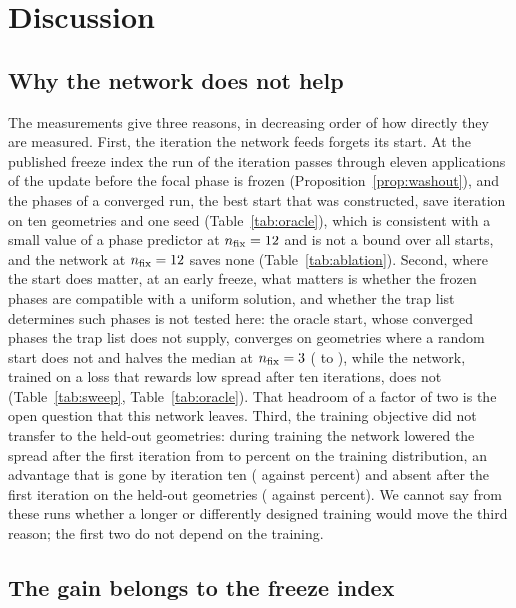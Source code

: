 \section{Discussion}\label{sec:discussion}

\subsection{Why the network does not help}\label{sec:why-not}

The measurements give three reasons, in decreasing order of how directly they are measured. First, the iteration the network feeds forgets its start. At the published freeze index the run of the iteration passes through eleven applications of the update before the focal phase is frozen (Proposition~\ref{prop:washout}), and the phases of a converged run, the best start that was constructed, save \OTwelveGain{} iteration on ten geometries and one seed (Table~\ref{tab:oracle}), which is consistent with a small value of a phase predictor at $n_{\mathrm{fix}}=12$ and is not a bound over all starts, and the network at $n_{\mathrm{fix}}=12$ saves none (Table~\ref{tab:ablation}).
Second, where the start does matter, at an early freeze, what matters is whether the frozen phases are compatible with a uniform solution, and whether the trap list determines such phases is not tested here: the oracle start, whose converged phases the trap list does not supply, converges on geometries where a random start does not and halves the median at $n_{\mathrm{fix}}=3$ (\ORThreeMed{} to \OThreeMed{}), while the network, trained on a loss that rewards low spread after ten iterations, does not (Table~\ref{tab:sweep}, Table~\ref{tab:oracle}). That headroom of a factor of two is the open question that this network leaves. Third, the training objective did not transfer to the held-out geometries: during training the network lowered the spread after the first iteration
from \trainSigRandFirst{} to \trainSigNetFirst{} percent on the training distribution, an advantage that is gone by iteration ten (\trainSigNet{} against \trainSigRand{} percent) and absent after the first iteration on the held-out geometries (\trNThreeOne{} against \trRTwelveOne{} percent). We cannot say from these runs whether a longer or differently designed training would move the third reason; the first two do not depend on the training.

\subsection{The gain belongs to the freeze index}\label{sec:freeze-gain}

